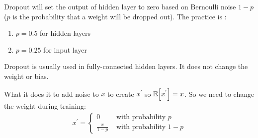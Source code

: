 Dropout will set the output of hidden layer to zero based on Bernoulli noise $1-p$ ($p$ is the probability that a weight will be dropped out). The practice is :
\begin{enumerate}
    \item $p=0.5$ for hidden layers
    \item $p= 0.25$ for input layer
\end{enumerate}

Dropout is usually used in fully-connected hidden layers. It does not change the weight or bias. 



What it does it to add noise to $x$ to create $x^{'}$ so $\expectation{x^{'}}= x$. So we need to change the weight during training:
\begin{equation}
    \begin{aligned}
        x^{'} = \begin{cases}
            0 & \text{ with probability }  p \\
            \displaystyle \frac{x}{1-p} & \text{ with probability }  1-p
        \end{cases}
    \end{aligned}
\end{equation}


